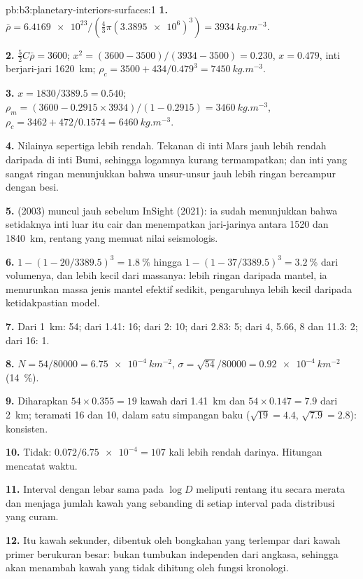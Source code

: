 \begin{solution}{pb:b3:planetary-interiors-surfaces:1}
\textbf{1.} $\bar\rho = \num{6.4169e23}/(\tfrac43\pi(\num{3.3895e6})^3) =
\qty{3934}{kg.m^{-3}}$.

\textbf{2.} $\tfrac52C\bar\rho = 3600$; $x^2 = (3600 - 3500)/(3934 - 3500) =
0.230$, $x = 0.479$, inti berjari-jari \qty{1620}{km}; $\rho_c = 3500 +
434/0.479^3 = \qty{7450}{kg.m^{-3}}$.

\textbf{3.} $x = 1830/3389.5 = 0.540$; $\rho_m = (3600 - 0.2915\times
3934)/(1 - 0.2915) = \qty{3460}{kg.m^{-3}}$, $\rho_c = 3462 +
472/0.1574 = \qty{6460}{kg.m^{-3}}$.

\textbf{4.} Nilainya sepertiga lebih rendah. Tekanan di inti Mars jauh
lebih rendah daripada di inti Bumi, sehingga logamnya kurang termampatkan; dan
inti yang sangat ringan menunjukkan bahwa unsur-unsur jauh lebih ringan bercampur dengan besi.

\textbf{5.}  (2003) muncul jauh sebelum InSight (2021): ia
sudah menunjukkan bahwa setidaknya inti luar itu cair dan menempatkan jari-jarinya
antara 1520 dan \qty{1840}{km}, rentang yang memuat
nilai seismologis.

\textbf{6.} $1 - (1 - 20/3389.5)^3 = \qty{1.8}{\percent}$ hingga $1 - (1 -
37/3389.5)^3 = \qty{3.2}{\percent}$ dari volumenya, dan lebih kecil dari massanya:
lebih ringan daripada mantel, ia menurunkan massa jenis mantel efektif sedikit,
pengaruhnya lebih kecil daripada ketidakpastian model.

\textbf{7.} Dari \qty{1}{km}: 54; dari 1.41: 16; dari 2: 10; dari 2.83: 5;
dari 4, 5.66, 8 dan 11.3: 2; dari 16: 1.

\textbf{8.} $N = 54/80000 = \qty{6.75e-4}{km^{-2}}$, $\sigma = \sqrt{54}/80000
= \qty{0.92e-4}{km^{-2}}$ (\qty{14}{\percent}).

\textbf{9.} Diharapkan $54\times0.355 = 19$ kawah dari \qty{1.41}{km} dan
$54\times0.147 = 7.9$ dari \qty{2}{km}; teramati 16 dan 10, dalam satu
simpangan baku ($\sqrt{19} = 4.4$, $\sqrt{7.9} = 2.8$): konsisten.

\textbf{10.} Tidak: $0.072/\num{6.75e-4} = 107$ kali lebih rendah darinya. Hitungan
mencatat waktu.

\textbf{11.} Interval dengan lebar sama pada $\log D$ meliputi rentang itu secara merata dan
menjaga jumlah kawah yang sebanding di setiap interval pada distribusi yang curam.

\textbf{12.} Itu kawah sekunder, dibentuk oleh bongkahan yang terlempar dari
kawah primer berukuran besar: bukan tumbukan independen dari angkasa, sehingga akan menambah
kawah yang tidak dihitung oleh fungsi kronologi.


\end{solution}
